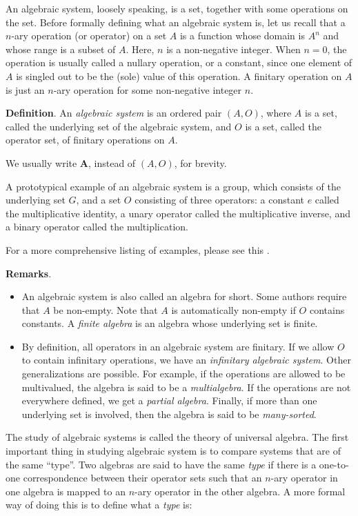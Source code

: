 \documentclass[12pt]{article}
\theoremstyle{definition}
\begin{document}
An algebraic system, loosely speaking, is a set, together with some operations on the set.  Before formally defining what an algebraic system is, let us recall that a $n$-ary operation (or operator) on a set $A$ is a function whose domain is $A^n$ and whose range is a subset of $A$.  Here, $n$ is a non-negative integer.  When $n=0$, the operation is usually called a nullary operation, or a constant, since one element of $A$ is singled out to be the (sole) value of this operation.  A finitary operation on $A$ is just an $n$-ary operation for some non-negative integer $n$.

\textbf{Definition}.  An \emph{algebraic system} is an ordered pair $(A,O)$, where $A$ is a set, called the underlying set of the algebraic system, and $O$ is a set, called the operator set, of finitary operations on $A$.  

We usually write $\boldsymbol{A}$, instead of $(A,O)$, for brevity.

A prototypical example of an algebraic system is a group, which consists of the underlying set $G$, and a set $O$ consisting of three operators: a constant $e$ called the multiplicative identity, a unary operator called the multiplicative inverse, and a binary operator called the multiplication.  

For a more comprehensive listing of examples, please see this .

\textbf{Remarks}.  
\begin{itemize}
\item
An algebraic system is also called an algebra for short.  Some authors require that $A$ be non-empty.  Note that $A$ is automatically non-empty if $O$ contains constants.  A \emph{finite algebra} is an algebra whose underlying set is finite.
\item
By definition, all operators in an algebraic system are finitary.  If we allow $O$ to contain infinitary operations, we have an \emph{infinitary algebraic system}.  Other generalizations are possible.  For example, if the operations are allowed to be multivalued, the algebra is said to be a \emph{multialgebra}.  If the operations are not everywhere defined, we get a \emph{partial algebra}.  Finally, if more than one underlying set is involved, then the algebra is said to be \emph{many-sorted}.
\end{itemize}

The study of algebraic systems is called the theory of universal algebra.  The first important thing in studying algebraic system is to compare systems that are of the same ``type''.  Two algebras are said to have the same \emph{type} if there is a one-to-one correspondence between their operator sets such that an $n$-ary operator in one algebra is mapped to an $n$-ary operator in the other algebra.  A more formal way of doing this is to define what a \emph{type} is:
\end{document}
